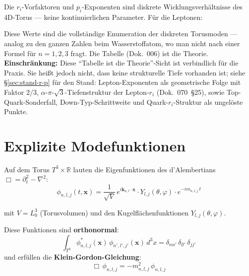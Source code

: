 Die $r_i$-Vorfaktoren und $p_i$-Exponenten sind diskrete Wicklungsverhältnisse
des 4D-Torus — keine kontinuierlichen Parameter. Für die Leptonen:

\begin{center}
{\footnotesize
{}
}
\end{center}

Diese Werte sind die vollständige Enumeration der diskreten Torusmoden —
analog zu den ganzen Zahlen beim Wasserstoffatom, wo man nicht nach einer
Formel für $n=1,2,3$ fragt. Die Tabelle (Dok.~006) ist die Theorie.
\textbf{Einschränkung:} Diese \enquote{Tabelle ist die Theorie}-Sicht
ist verbindlich für die Praxis. Sie heißt jedoch nicht, dass keine
strukturelle Tiefe vorhanden ist; siehe §\ref{sec:stand-r-p} für
den Stand: Lepton-Exponenten als geometrische Folge mit Faktor $2/3$,
$\alpha$-$\pi$-$\sqrt{3}$-Tiefenstruktur der Lepton-$r_i$ (Dok.~070~§25),
sowie Top-Quark-Sonderfall, Down-Typ-Schrittweite und Quark-$r_i$-Struktur
als ungelöste Punkte.

\section{Explizite Modefunktionen}

Auf dem Torus $T^3 \times \mathbb{R}$ lauten die Eigenfunktionen des
d'Alembertians $\Box = \partial_t^2 - \nabla^2$:
\begin{equation}
  \boxed{
    \phi_{n,l,j}(t,\mathbf{x})
    = \frac{1}{\sqrt{V}}\,
      e^{i\mathbf{k}_{n,l}\cdot\mathbf{x}} \cdot
      Y_{l,j}(\theta,\varphi) \cdot
      e^{-im_{n,l,j}\,t}
  }
\end{equation}

mit $V = L_0^3$ (Torusvolumen) und den Kugelflächenfunktionen
$Y_{l,j}(\theta,\varphi)$.

Diese Funktionen sind \textbf{orthonormal}:
\begin{equation}
  \int_{T^3} \phi_{n,l,j}^*(\mathbf{x})\,\phi_{n',l',j'}(\mathbf{x})\,d^3x
  = \delta_{nn'}\,\delta_{ll'}\,\delta_{jj'}
\end{equation}
und erfüllen die \textbf{Klein-Gordon-Gleichung}:
\begin{equation}
  \Box\,\phi_{n,l,j} = -m_{n,l,j}^2\,\phi_{n,l,j}
\end{equation}

